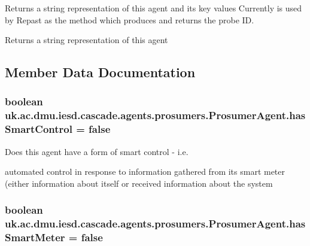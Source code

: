 Returns a string representation of this agent and its key values Currently is used by Repast as the method which produces and returns the probe I\-D. 

\begin{DoxyReturn}{Returns}
a string representation of this agent 
\end{DoxyReturn}


\subsection{Member Data Documentation}
\hypertarget{classuk_1_1ac_1_1dmu_1_1iesd_1_1cascade_1_1agents_1_1prosumers_1_1_prosumer_agent_aafc0b05ea964cf7dcfc729a04814480b}{
\subsubsection[{has\-Smart\-Control}]{\setlength{\rightskip}{0pt plus 5cm}boolean uk.\-ac.\-dmu.\-iesd.\-cascade.\-agents.\-prosumers.\-Prosumer\-Agent.\-has\-Smart\-Control = false}}\label{classuk_1_1ac_1_1dmu_1_1iesd_1_1cascade_1_1agents_1_1prosumers_1_1_prosumer_agent_aafc0b05ea964cf7dcfc729a04814480b}


Does this agent have a form of smart control -\/ i.\-e. 

automated control in response to information gathered from its smart meter (either information about itself or received information about the system \hypertarget{classuk_1_1ac_1_1dmu_1_1iesd_1_1cascade_1_1agents_1_1prosumers_1_1_prosumer_agent_a6d748d17b6118067086a69c34b4469a7}{
\subsubsection[{has\-Smart\-Meter}]{\setlength{\rightskip}{0pt plus 5cm}boolean uk.\-ac.\-dmu.\-iesd.\-cascade.\-agents.\-prosumers.\-Prosumer\-Agent.\-has\-Smart\-Meter = false}}\label{classuk_1_1ac_1_1dmu_1_1iesd_1_1cascade_1_1agents_1_1prosumers_1_1_prosumer_agent_a6d748d17b6118067086a69c34b4469a7}


